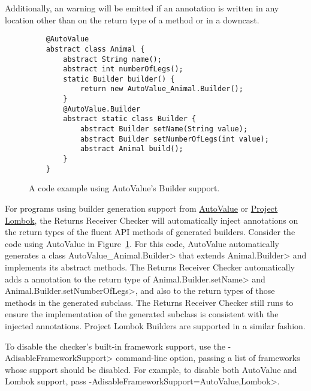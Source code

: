 Additionally, an  warning will be emitted if an
 annotation is written in any
location other than on the return type of a method or in a downcast.



\begin{figure}
    \begin{Verbatim}
    @AutoValue
    abstract class Animal {
        abstract String name();
        abstract int numberOfLegs();
        static Builder builder() {
            return new AutoValue_Animal.Builder();
        }
        @AutoValue.Builder
        abstract static class Builder {
            abstract Builder setName(String value);
            abstract Builder setNumberOfLegs(int value);
            abstract Animal build();
        }
    }
    \end{Verbatim}
    \caption{A code example using AutoValue's Builder support.}
    \label{fig-autovalue-builder}
\end{figure}

For programs using builder generation support from
\href{https://github.com/google/auto/tree/master/value}{AutoValue} or
\href{https://projectlombok.org/}{Project Lombok}, the Returns Receiver Checker
will automatically inject 
annotations on the return types of the fluent API methods of generated builders.
Consider the code using AutoValue in Figure~\ref{fig-autovalue-builder}.  For
this code, AutoValue automatically generates a class
\<AutoValue\_Animal.Builder> that extends \<Animal.Builder> and implements its
abstract methods.  The Returns Receiver Checker automatically adds a
 annotation to the return type of
\<Animal.Builder.setName> and \<Animal.Builder.setNumberOfLegs>, and also to the
return types of those methods in the generated subclass.  The Returns Receiver
Checker still runs to ensure the implementation of the generated subclass is
consistent with the injected annotations.  Project Lombok Builders are supported
in a similar fashion.

To disable the checker's built-in framework support, use the
\<-AdisableFrameworkSupport> command-line option, passing a list of frameworks
whose support should be disabled.  For example, to disable both AutoValue and
Lombok support, pass \<-AdisableFrameworkSupport=AutoValue,Lombok>.
